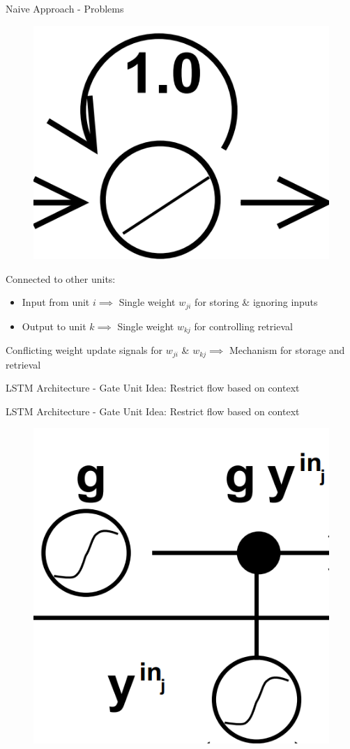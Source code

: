 \documentclass[10pt, aspectratio=169]{beamer}
\begin{document}
\begin{frame}[t]{Naive Approach - Problems}
\begin{figure}
        \centering
        \includegraphics[width=0.25\linewidth]{images/ConstantErrorCarousel.png}
    \end{figure}
Connected to other units:
\begin{itemize}
    \item Input from unit \begin{math}i\implies\end{math} Single weight \begin{math}w_{ji}\end{math} for storing \& ignoring inputs
    
    \item Output to unit \begin{math}k\implies\end{math} Single weight \begin{math}w_{kj}\end{math} for controlling retrieval
\end{itemize}
Conflicting weight update signals for \begin{math}w_{ji}\end{math} \& \begin{math}w_{kj}\implies\end{math} Mechanism for storage and retrieval
\end{frame}

\begin{frame}[t]{LSTM Architecture - Gate Unit}
Idea: Restrict flow based on context
\end{frame}

\begin{frame}[t]{LSTM Architecture - Gate Unit}
Idea: Restrict flow based on context
\begin{figure}
    \centering
    \includegraphics[width=0.2\linewidth]{images/GateUnit.png}
\end{figure}
\end{frame}
\end{document}
